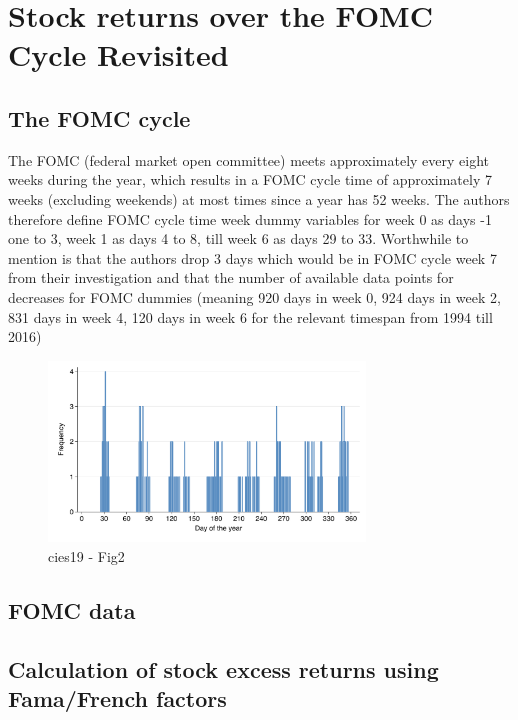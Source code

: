 \chapter{Stock returns over the FOMC Cycle Revisited }


\section{The FOMC cycle}

The FOMC (federal market open committee) meets approximately every eight weeks during the year, which results in a FOMC cycle time of approximately 7 weeks (excluding weekends) at most times since a year has 52 weeks.
The authors therefore define FOMC cycle time week dummy variables for week 0 as days -1 one to 3, week 1 as days 4 to 8,  till week 6 as days 29 to 33. Worthwhile to mention is that the authors drop 3 days which would be in FOMC cycle week 7 from their investigation and that the number of available data points for decreases for FOMC dummies (meaning 920 days in week 0, 924 days in week 2, 831 days in week 4, 120 days in week 6 for the relevant timespan from 1994 till 2016)

\label{cies19_fig2}
\begin{figure}[h]
    \centering
    \includegraphics[width=0.75\textwidth]{figures/cies19/fig2}
    \caption{cies19 - Fig2}
\end{figure}


\section{FOMC data}

\newpage

\section{Calculation of stock excess returns using Fama/French factors}

